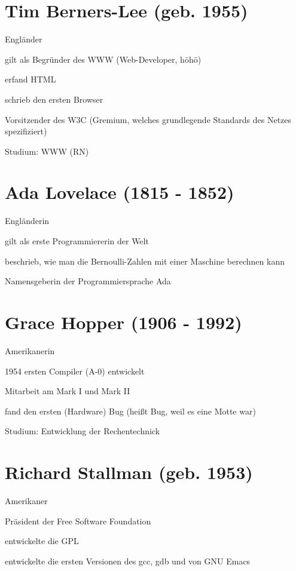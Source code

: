 \documentclass[a4paper,12pt]{report}
\begin{document}
\section*{Tim Berners-Lee (geb. 1955)}
\begin{itemize*}
	\item Engländer
	\item gilt als Begründer des WWW (Web-Developer, höhö)
	\item erfand HTML
	\item schrieb den ersten Browser
	\item Vorsitzender des W3C (Gremium, welches grundlegende Standards des Netzes spezifiziert)
	\item Studium: WWW (RN)
\end{itemize*}

\section*{Ada Lovelace (1815 - 1852)}
\begin{itemize*}
	\item Engländerin
	\item gilt als erste Programmiererin der Welt
	\item beschrieb, wie man die Bernoulli-Zahlen mit einer Maschine berechnen kann
	\item Namensgeberin der Programmiersprache Ada
\end{itemize*}

\section*{Grace Hopper (1906 - 1992)}
\begin{itemize*}
	\item Amerikanerin
	\item 1954 ersten Compiler (A-0) entwickelt
	\item Mitarbeit am Mark I und Mark II
	\item fand den ersten (Hardware) Bug (heißt Bug, weil es eine Motte war)
	\item Studium: Entwicklung der Rechentechnick
\end{itemize*}

\section*{Richard Stallman (geb. 1953)}
\begin{itemize*}
	\item Amerikaner
	\item Präsident der Free Software Foundation
	\item entwickelte die GPL
	\item entwickelte die ersten Versionen des gcc, gdb und von GNU Emacs
\end{itemize*}
\end{document}

